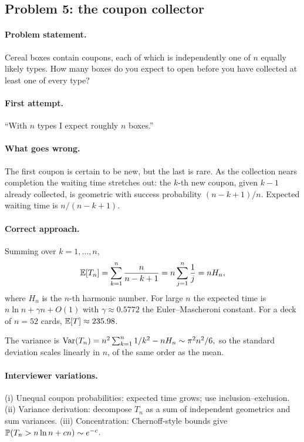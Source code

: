 \subsection{Problem 5: the coupon collector}
\label{sec:coupon}

\paragraph{Problem statement.}
Cereal boxes contain coupons, each of which is independently one
of $n$ equally likely types.  How many boxes do you expect to
open before you have collected at least one of every type?

\paragraph{First attempt.}
``With $n$ types I expect roughly $n$ boxes.''

\paragraph{What goes wrong.}
The first coupon is certain to be new, but the last is rare.  As
the collection nears completion the waiting time stretches out:
the $k$-th new coupon, given $k-1$ already collected, is geometric
with success probability $(n-k+1)/n$.  Expected waiting time is
$n/(n-k+1)$.

\paragraph{Correct approach.}
Summing over $k = 1, \dots, n$,
\[
\mathbb{E}[T_n]
= \sum_{k=1}^{n} \frac{n}{n-k+1}
= n \sum_{j=1}^{n} \frac{1}{j}
= n H_n,
\]
where $H_n$ is the $n$-th harmonic number.  For large $n$ the
expected time is $n \ln n + \gamma n + O(1)$ with
$\gamma \approx 0.5772$ the Euler--Mascheroni constant.  For a
deck of $n = 52$ cards, $\mathbb{E}[T] \approx 235.98$.

The variance is
\(
\operatorname{Var}(T_n) = n^2 \sum_{k=1}^{n} 1/k^2 - n H_n
\sim \pi^2 n^2 / 6,
\)
so the standard deviation scales linearly in $n$, of the same
order as the mean.

\paragraph{Interviewer variations.}
(i) Unequal coupon probabilities: expected time grows; use
inclusion--exclusion.  (ii) Variance derivation: decompose $T_n$
as a sum of independent geometrics and sum variances.  (iii)
Concentration: Chernoff-style bounds give $\mathbb{P}(T_n > n \ln n +
cn) \sim e^{-c}$.


